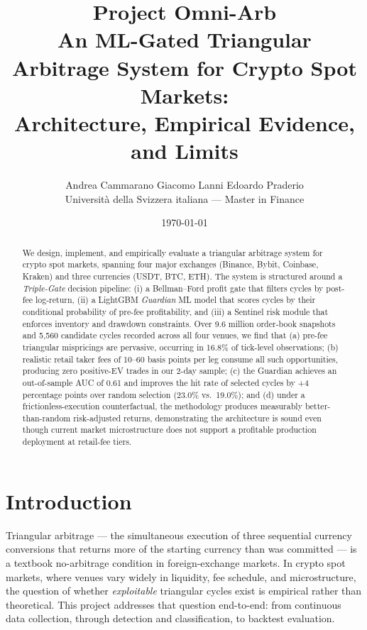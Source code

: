 \documentclass[11pt,a4paper]{article}
\title{
    \textbf{Project Omni-Arb}\\[0.4em]
    \large An ML-Gated Triangular Arbitrage System for Crypto Spot Markets:\\
    Architecture, Empirical Evidence, and Limits
}
\author{
    Andrea Cammarano \quad Giacomo Lanni \quad Edoardo Praderio \\
    \small Università della Svizzera italiana --- Master in Finance
}
\date{\today}
\begin{document}
\maketitle

\begin{abstract}
We design, implement, and empirically evaluate a triangular arbitrage system for crypto spot markets, spanning four major exchanges (Binance, Bybit, Coinbase, Kraken) and three currencies (USDT, BTC, ETH). The system is structured around a \emph{Triple-Gate} decision pipeline: (i) a Bellman--Ford profit gate that filters cycles by post-fee log-return, (ii) a LightGBM \emph{Guardian} ML model that scores cycles by their conditional probability of pre-fee profitability, and (iii) a Sentinel risk module that enforces inventory and drawdown constraints. Over 9.6 million order-book snapshots and 5{,}560 candidate cycles recorded across all four venues, we find that (a) pre-fee triangular mispricings are pervasive, occurring in 16.8\% of tick-level observations; (b) realistic retail taker fees of 10--60 basis points per leg consume all such opportunities, producing zero positive-EV trades in our 2-day sample; (c) the Guardian achieves an out-of-sample AUC of 0.61 and improves the hit rate of selected cycles by +4 percentage points over random selection (23.0\% vs.\ 19.0\%); and (d) under a frictionless-execution counterfactual, the methodology produces measurably better-than-random risk-adjusted returns, demonstrating the architecture is sound even though current market microstructure does not support a profitable production deployment at retail-fee tiers.
\end{abstract}

\section{Introduction}

Triangular arbitrage --- the simultaneous execution of three sequential currency conversions that returns more of the starting currency than was committed --- is a textbook no-arbitrage condition in foreign-exchange markets. In crypto spot markets, where venues vary widely in liquidity, fee schedule, and microstructure, the question of whether \emph{exploitable} triangular cycles exist is empirical rather than theoretical. This project addresses that question end-to-end: from continuous data collection, through detection and classification, to backtest evaluation.
\end{document}
